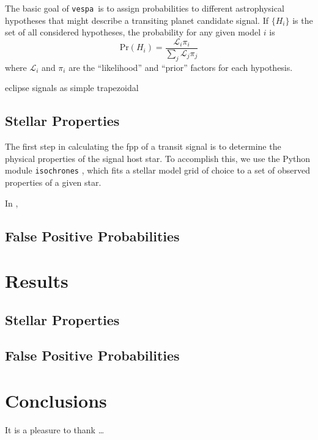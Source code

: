 \documentclass[preprint2]{aastex}
\newcommand{\vespa}{\texttt{vespa}}
\newcommand{\isochrones}{\texttt{isochrones}}
\begin{document}
The basic goal of \vespa\ is to assign probabilities to different
astrophysical hypotheses that might describe a transiting planet
candidate signal.  If $\{H_i\}$ is the set of all considered
hypotheses, the probability for any given model $i$ is
\begin{equation}
  \label{eq:prob}
  \mathrm{Pr}(H_i) = \frac{\mathcal L_i \pi_i}{\displaystyle \sum_j \mathcal L_j \pi_j}
\end{equation}
where $\mathcal L_i$ and $\pi_i$ are the ``likelihood'' and ``prior''
factors for each hypothesis.



eclipse signals as simple
trapezoidal 




\subsection{Stellar Properties}
\label{sec:methods:stellar}

The first step in calculating the \ac{fpp} of a transit signal is to
determine the physical properties of the signal host star.  To
accomplish this, we use the Python module \isochrones
\citep{isochrones}, which fits a stellar model grid of choice to a set
of observed properties of a given star.  

In , 


\subsection{False Positive Probabilities}
\label{sec:methods:fpp}



\section{Results}
\label{sec:results}


\subsection{Stellar Properties}
\label{sec:results:stars}


\subsection{False Positive Probabilities}
\label{sec:results:fpp}


\section{Conclusions}
\label{sec:conclusions}

\acknowledgments
It is a pleasure to thank
\ldots\

\clearpage

\clearpage
\end{document}
